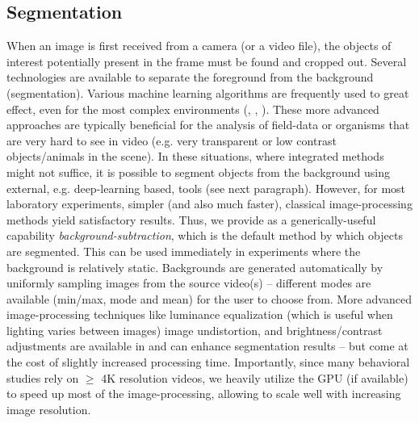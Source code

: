 \documentclass[9pt,lineno]{elife}
\newcommand{\TRex}{\protect\path{TRex}}
\newcommand{\TGrabs}{\protect\path{TGrabs}}
\begin{document}
\subsection{Segmentation}

When an image is first received from a camera (or a video file), the objects of interest potentially present in the frame must be {\color{blue}found} and cropped out. Several technologies are available to separate the foreground from the background (segmentation). Various machine learning algorithms are frequently used to great effect, even for the most complex environments (\citealt{hughey2018challenges}, \citealt{robie2017machine}, \citealt{francisco2019low}). These more advanced approaches are typically beneficial for the analysis of field-data or organisms that are very hard to see in video (e.g. very transparent or low contrast objects/animals in the scene). {\color{blue} In these situations, where integrated methods might not suffice, it is possible to segment objects from the background using external, e.g. deep-learning based, tools (see next paragraph).} However, for most laboratory experiments, simpler (and also much faster), classical image-processing methods yield satisfactory results. {\color{blue} Thus, we provide as a generically-useful capability \emph{background-subtraction}, which is the default method by which objects are segmented. This can be used immediately in experiments where the background is relatively static. Backgrounds are generated automatically by uniformly sampling images from the source video(s) -- different modes are available (min/max, mode and mean) for the user to choose from. More advanced image-processing techniques like luminance equalization (which is useful when lighting varies between images) image undistortion, and brightness/contrast adjustments are available in \TGrabs{} and can enhance segmentation results -- but come at the cost of slightly increased processing time.} Importantly, since many behavioral studies rely on $\ge$ 4K resolution videos, we heavily utilize the GPU (if available) to speed up most of the image-processing, allowing \TRex{} to scale well with increasing image resolution.
\end{document}
